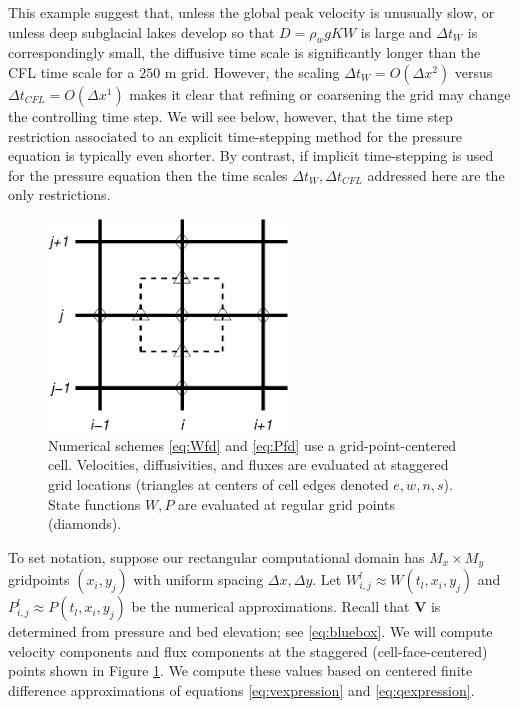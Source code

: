 \documentclass[11pt,final]{amsart}
\newcommand\bV{\mathbf{V}}
\newcommand{\Wlij}{W^l_{i,j}}
\newcommand{\Plij}{P^l_{i,j}}
\begin{document}
This example suggest that, unless the global peak velocity is unusually slow, or unless deep subglacial lakes develop so that $D = \rho_w g K W$ is large and $\Delta t_W$ is correspondingly small, the diffusive time scale is significantly longer than the CFL time scale for a $250$ m grid.  However, the scaling $\Delta t_W = O(\Delta x^2)$ versus $\Delta t_{CFL} = O(\Delta x^1)$ makes it clear that refining or coarsening the grid may change the controlling time step.  We will see below, however, that the time step restriction associated to an explicit time-stepping method for the pressure equation is typically even shorter.  By contrast, if implicit time-stepping is used for the pressure equation \cite{Hewittetal2012,Schoofetal2012} then the time scales $\Delta t_W, \Delta t_{CFL}$ addressed here are the only restrictions.

\begin{figure}[ht]
\centering
\includegraphics[width=2.5in,keepaspectratio=true]{diffstencil}
\bigskip
\caption{Numerical schemes \eqref{eq:Wfd} and \eqref{eq:Pfd} use a grid-point-centered cell.  Velocities, diffusivities, and fluxes are evaluated at staggered grid locations (triangles at centers of cell edges denoted $e,w,n,s$).  State functions $W,P$ are evaluated at regular grid points (diamonds).}
\label{fig:stencil}
\end{figure}

To set notation, suppose our rectangular computational domain has $M_x \times M_y$ gridpoints $(x_i,y_j)$ with uniform spacing $\Delta x,\Delta y$.  Let $\Wlij \approx W(t_l,x_i,y_j)$ and $\Plij \approx P(t_l,x_i,y_j)$ be the numerical approximations.  Recall that $\bV$ is determined from pressure and bed elevation; see \eqref{eq:bluebox}.  We will compute velocity components and flux components at the staggered (cell-face-centered) points shown in Figure \ref{fig:stencil}.  We compute these values based on centered finite difference approximations of equations \eqref{eq:vexpression} and \eqref{eq:qexpression}.
\end{document}
